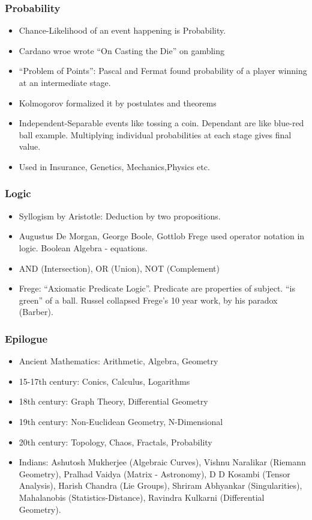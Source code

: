 \begin{frame}[fragile]
\frametitle{Probability}
\begin{itemize}
\item Chance-Likelihood of an event happening is Probability.
\item Cardano wroe wrote ``On Casting the Die'' on gambling
\item ``Problem of Points'': Pascal and Fermat found probability of a player winning at an intermediate stage.
\item Kolmogorov formalized it by postulates and theorems
\item Independent-Separable events like tossing a coin. Dependant are like blue-red ball example. Multiplying individual probabilities at each stage gives final value.
\item Used in Insurance, Genetics, Mechanics,Physics etc.
\end{itemize}
\end{frame}

\begin{frame}[fragile]
\frametitle{Logic}
\begin{itemize}
\item Syllogism by Aristotle: Deduction by two propositions.
\item Augustus De Morgan, George Boole, Gottlob Frege used operator notation in logic. Boolean Algebra - equations.
\item AND (Intersection), OR (Union), NOT (Complement)
\item Frege: ``Axiomatic Predicate Logic''. Predicate are properties of subject. ``is green'' of a ball. Russel collapsed Frege's 10 year work, by his paradox (Barber).
\end{itemize}
\end{frame}

\begin{frame}[fragile]
\frametitle{Epilogue}

\begin{itemize}
\item Ancient Mathematics: Arithmetic, Algebra, Geometry
\item 15-17th century: Conics, Calculus, Logarithms
\item 18th century: Graph Theory, Differential Geometry
\item 19th century: Non-Euclidean Geometry, N-Dimensional
\item 20th century: Topology, Chaos, Fractals, Probability
\item Indians: Ashutosh Mukherjee (Algebraic Curves), Vishnu Naralikar (Riemann Geometry), Pralhad Vaidya (Matrix - Astronomy), D D Kosambi (Tensor Analysis), Harish Chandra (Lie Groups), Shriram Abhyankar (Singularities), Mahalanobis  (Statistics-Distance), Ravindra Kulkarni (Differential Geometry).
\end{itemize}
\end{frame}



